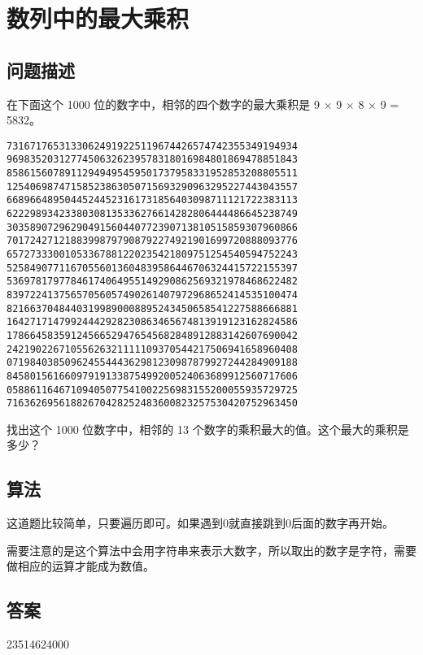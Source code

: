 \section{数列中的最大乘积}
\subsection{问题描述}
\begin{tcolorbox}
在下面这个 1000 位的数字中，相邻的四个数字的最大乘积是 9 × 9 × 8 × 9 = 5832。

\begin{verbatim}
73167176531330624919225119674426574742355349194934
96983520312774506326239578318016984801869478851843
85861560789112949495459501737958331952853208805511
12540698747158523863050715693290963295227443043557
66896648950445244523161731856403098711121722383113
62229893423380308135336276614282806444486645238749
30358907296290491560440772390713810515859307960866
70172427121883998797908792274921901699720888093776
65727333001053367881220235421809751254540594752243
52584907711670556013604839586446706324415722155397
53697817977846174064955149290862569321978468622482
83972241375657056057490261407972968652414535100474
82166370484403199890008895243450658541227588666881
16427171479924442928230863465674813919123162824586
17866458359124566529476545682848912883142607690042
24219022671055626321111109370544217506941658960408
07198403850962455444362981230987879927244284909188
84580156166097919133875499200524063689912560717606
05886116467109405077541002256983155200055935729725
71636269561882670428252483600823257530420752963450
\end{verbatim}

找出这个 1000 位数字中，相邻的 13 个数字的乘积最大的值。这个最大的乘积是多少？
\end{tcolorbox}

\subsection{算法}
这道题比较简单，只要遍历即可。如果遇到0就直接跳到0后面的数字再开始。

需要注意的是这个算法中会用字符串来表示大数字，所以取出的数字是字符，需要做相应的运算才能成为数值。

\subsection{答案}
23514624000
